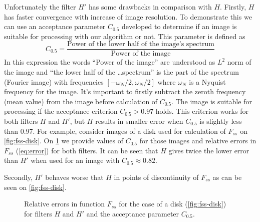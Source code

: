 \documentclass[reprint,amsmath,amssymb,aps,pre,showkeys,showpacs]{revtex4-1}
\begin{document}
Unfortunately the filter $H'$ has some drawbacks in comparison with
$H$. Firstly, $H$ has faster convergence with increase of image resolution. To
demonstrate this we can use an acceptance parameter $C_{0.5}$ developed to
determine if an image is suitable for processing with our algorithm or not. This
parameter is defined as
\begin{equation*}
  C_{0.5} = \frac{\text{Power of the lower half of the image's
      spectrum}}{\text{Power of the image}}
\end{equation*}
In this expression the words ``Power of the image'' are understood as $L^2$ norm
of the image and ``the lower half of the \dots spectrum'' is the part of the
spectrum (Fourier image) with frequencies $[-\omega_N/2, \omega_N/2]$ where
$\omega_N$ is a Nyquist frequency for the image. It's important to firstly
subtract the zeroth frequency (mean value) from the image before calculation of
$C_{0.5}$. The image is suitable for processing if the acceptance criterion
$C_{0.5} > 0.97$ holds. This criterion works for both filters $H$ and $H'$, but
$H$ results in smaller error when $C_{0.5}$ is slightly less than 0.97. For
example, consider images of a disk used for calculation of $F_{ss}$ on
\cref{fig:fss-disk}. On \cref{fig:error} we provide values of $C_{0.5}$ for
those images and relative errors in $F_{ss}$ (\cref{eq:error}) for both
filters. It can be seen that $H$ gives twice the lower error than $H'$ when used
for an image with $C_{0.5} \approx 0.82$.

Secondly, $H'$ behaves worse that $H$ in points
of discontinuity of $F_{ss}$ as can be seen on \cref{fig:fss-disk}.

\begin{figure}[!hpt]
  \centering
  \hfill
  \caption[]{Relative errors in function $F_{ss}$ for the case of a disk
    (\cref{fig:fss-disk}) for filters $H$ and $H'$ and the acceptance parameter
    $C_{0.5}$.}
  \label{fig:error}
\end{figure}
\end{document}
